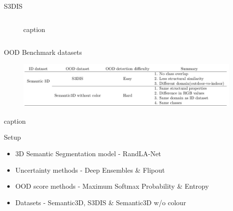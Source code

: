 \documentclass[aspectratio=169]{beamer}
\begin{document}
\begin{frame}{S3DIS}
\begin{columns}
\begin{column}{0.4\textwidth}
\begin{figure}
                \caption{caption}
                \label{fig:s3dis_sample_images}
            \end{figure}
        \end{column}
    \end{columns}
\end{frame}
\begin{frame}{OOD Benchmark datasets}
    \begin{figure}
        \centering
        \includegraphics[scale=0.33]{images/benchmark_table.jpg}
    \end{figure}
    \begin{table}
        \caption{caption}
    \end{table}
\end{frame}
\begin{frame}[noframenumbering]{Setup}
    \begin{itemize}
        \item 3D Semantic Segmentation model - RandLA-Net
        \item Uncertainty methods - Deep Ensembles \& Flipout
        \item OOD score methods - Maximum Softmax Probability \& Entropy
        \item Datasets - Semantic3D, S3DIS \& Semantic3D w/o colour
    \end{itemize}
\end{frame}
\end{document}
